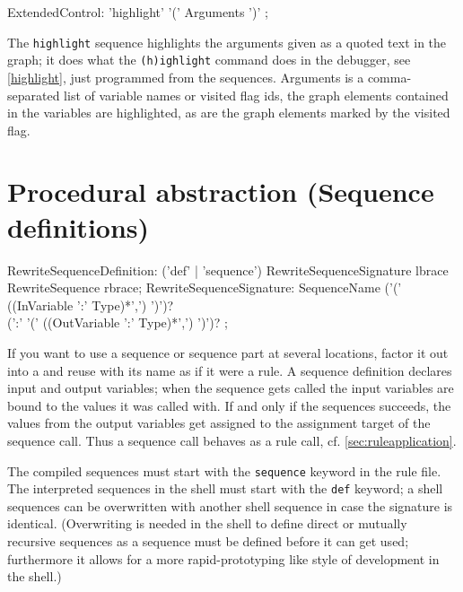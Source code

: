 \begin{rail}
  ExtendedControl:
		'highlight' '(' Arguments ')'
    ;
\end{rail}
The \texttt{highlight} sequence highlights the arguments given as a quoted text in the graph;
it does what the \texttt{(h)ighlight} command does in the debugger, see \ref{highlight}, just programmed from the sequences. 
Arguments is a comma-separated list of variable names or visited flag ids, the graph elements contained in the variables are highlighted, as are the graph elements marked by the visited flag.

\section{Procedural abstraction (Sequence definitions)} \label{sec:sequencedefinition}
\begin{rail}
  RewriteSequenceDefinition: 
    ('def' | 'sequence') RewriteSequenceSignature lbrace RewriteSequence rbrace;
  RewriteSequenceSignature: 
    SequenceName ('(' ((InVariable ':' Type)*',') ')')? \\ (':' '(' ((OutVariable ':' Type)*',') ')')?
	;
\end{rail}

If you want to use a sequence or sequence part at several locations, factor it out into a  and reuse with its name as if it were a rule.
A sequence definition declares input and output variables; 
when the sequence gets called the input variables are bound to the values it was called with.
If and only if the sequences succeeds, the values from the output variables get assigned to the assignment target of the sequence call.
Thus a sequence call behaves as a rule call, cf. \ref{sec:ruleapplication}.

The compiled sequences must start with the \texttt{sequence} keyword in the rule file.
The interpreted sequences in the shell must start with the \texttt{def} keyword; a shell sequences can be overwritten with another shell sequence in case the signature is identical. (Overwriting is needed in the shell to define direct or mutually recursive sequences as a sequence must be defined before it can get used; furthermore it allows for a more rapid-prototyping like style of development in the shell.)


